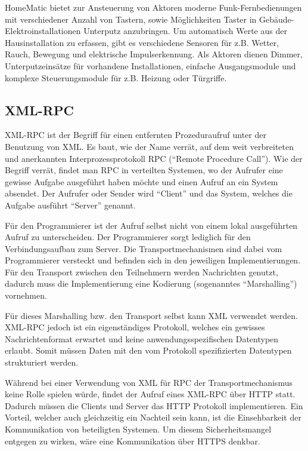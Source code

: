 HomeMatic bietet zur Ansteuerung von Aktoren moderne Funk-Fernbedienungen mit verschiedener
Anzahl von Tastern, sowie Möglichkeiten Taster in Gebäude-Elektroinstallationen Unterputz anzubringen.
Um automatisch Werte aus der Hausinstallation zu erfassen, gibt es verschiedene Sensoren für z.B.
Wetter, Rauch, Bewegung und elektrische Impulserkennung.
Als Aktoren dienen Dimmer, Unterputzeinsätze für vorhandene Installationen, einfache Ausgangsmodule und
komplexe Steuerungsmodule für z.B. Heizung oder Türgriffe.

\subsection{XML-RPC}

XML-RPC ist der Begriff für einen entfernten Prozeduraufruf unter der Benutzung von XML.
Es baut, wie der Name verrät, auf dem weit verbreiteten und anerkannten Interprozessprotokoll RPC
(``Remote Procedure Call'').
Wie der Begriff verrät, findet man RPC in verteilten Systemen, wo der Aufrufer eine gewisse
Aufgabe ausgeführt haben möchte und einen Aufruf an ein System absendet.
Der Aufrufer oder Sender wird ``Client'' und das System, welches die Aufgabe ausführt ``Server'' genannt.


Für den Programmierer ist der Aufruf selbst nicht von einem lokal ausgeführten Aufruf zu unterscheiden.
Der Programmierer sorgt lediglich für den Verbindungsaufbau zum Server.
Die Transportmechanismen sind dabei vom Programmierer versteckt und befinden sich in den jeweiligen
Implementierungen.
Für den Transport zwischen den Teilnehmern werden Nachrichten genutzt, dadurch muss die Implementierung
eine Kodierung (sogenanntes ``Marshalling'') vornehmen.

Für dieses Marshalling bzw. den Transport selbst kann XML verwendet werden.
XML-RPC jedoch ist ein eigenständiges Protokoll, welches ein gewisses Nachrichtenformat erwartet und keine
anwendungsspezifischen Datentypen erlaubt.
Somit müssen Daten mit den vom Protokoll spezifizierten Datentypen strukturiert werden.

Während bei einer Verwendung von XML für RPC der Transportmechanismus keine Rolle spielen würde, findet
der Aufruf eines XML-RPC über HTTP statt.
Dadurch müssen die Clients und Server das HTTP Protokoll implementieren.
Ein Vorteil, welcher auch gleichzeitig ein Nachteil sein kann, ist die Einsehbarkeit der Kommunikation
von beteiligten Systemen.
Um diesem Sicherheitsmangel entgegen zu wirken, wäre eine Kommunikation über HTTPS denkbar.
